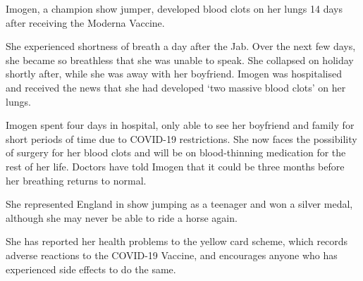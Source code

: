 Imogen, a champion show jumper, developed blood clots on her lungs 14 days after
receiving the Moderna Vaccine.

She experienced shortness of breath a day after the Jab. Over the next few days,
she became so breathless that she was unable to speak. She collapsed on holiday
shortly after, while she was away with her boyfriend. Imogen was hospitalised
and received the news that she had developed ‘two massive blood clots’ on her
lungs.

Imogen spent four days in hospital, only able to see her boyfriend and family
for short periods of time due to COVID-19 restrictions. She now faces the
possibility of surgery for her blood clots and will be on blood-thinning
medication for the rest of her life. Doctors have told Imogen that it could be
three months before her breathing returns to normal.

She represented England in show jumping as a teenager and won a silver medal,
although she may never be able to ride a horse again.

She has reported her health problems to the yellow card scheme, which records
adverse reactions to the COVID-19 Vaccine, and encourages anyone who has
experienced side effects to do the same.

